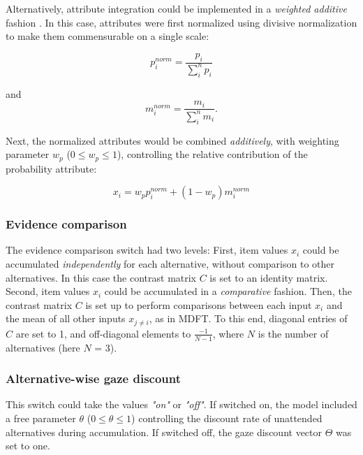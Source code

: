 \documentclass[11pt, a4paper]{article}
\begin{document}
Alternatively, attribute integration could be implemented in a \emph{weighted additive} fashion \parencite[]{rouault2019PrefrontalMechanismsCombining}. In this case, attributes were first normalized using divisive normalization \parencite{louie2013NormalizationGeneralNeural} to make them commensurable on a single scale:

\begin{equation}
p^{norm}_i = \frac{p_i}{\sum_i^n{p_i}}
\end{equation}

and
\begin{equation}
m^{norm}_i = \frac{m_i}{\sum_i^n{m_i}}.
\end{equation}

Next, the normalized attributes would be combined \emph{additively}, with weighting parameter $w_p$ ($0 \le w_p \le 1$), controlling the relative contribution of the probability attribute:

\begin{equation}
x_i = w_p p^{norm}_i + (1 - w_p) m^{norm}_i
\end{equation}

\subsubsection*{Evidence comparison}
The evidence comparison switch had two levels: First, item values $x_i$ could be accumulated \emph{independently} for each alternative, without comparison to other alternatives. In this case the contrast matrix $C$ is set to an identity matrix. Second, item values $x_i$ could be accumulated in a \emph{comparative} fashion. Then, the contrast matrix $C$ is set up to perform comparisons between each input $x_i$ and the mean of all other inputs $x_{j \ne i}$, as in MDFT. To this end, diagonal entries of $C$ are set to 1, and off-diagonal elements to $\frac{-1}{N-1}$, where $N$ is the number of alternatives (here $N$ = 3).

\subsubsection*{Alternative-wise gaze discount}
This switch could take the values \emph{"on"} or \emph{"off"}. If switched on, the model included a free parameter $\theta$ ($0 \le \theta \le 1$) controlling the discount rate of unattended alternatives during accumulation. If switched off, the gaze discount vector $\Theta$ was set to one.
\end{document}
